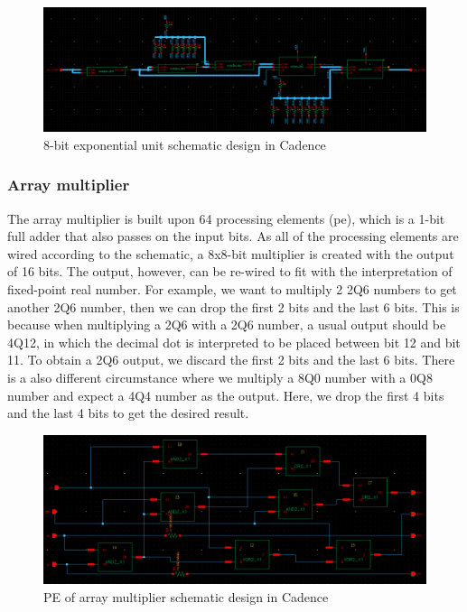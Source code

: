 \documentclass[letterpaper, 11pt]{article}
\begin{document}
	
	\begin{figure}[htb!]
		\centering
		\includegraphics[width=0.85\linewidth]{report_pics/exp8b_schem.png}
		\caption{8-bit exponential unit schematic design in Cadence}
		\label{fig10}
	\end{figure}
	
	\newpage
	
	\subsubsection{Array multiplier}
	The array multiplier is built upon 64 processing elements (pe), which is a 1-bit full adder that also passes on the input bits. As all of the processing elements are wired according to the schematic, a 8x8-bit multiplier is created with the output of 16 bits. The output, however, can be re-wired to fit with the interpretation of fixed-point real number. For example, we want to multiply 2 2Q6 numbers to get another 2Q6 number, then we can drop the first 2 bits and the last 6 bits. This is because when multiplying a 2Q6 with a 2Q6 number, a usual output should be 4Q12, in which the decimal dot is interpreted to be placed between bit 12 and bit 11. To obtain a 2Q6 output, we discard the first 2 bits and the last 6 bits. There is a also different circumstance where we multiply a 8Q0 number with a 0Q8 number and expect a 4Q4 number as the output. Here, we drop the first 4 bits and the last 4 bits to get the desired result.
	
	\begin{figure}[htb!]
		\centering
		\includegraphics[width=0.85\linewidth]{report_pics/arr_mult_pe_schem.png}
		\caption{PE of array multiplier schematic design in Cadence}
		\label{fig11}
	\end{figure}
	
\end{document}
